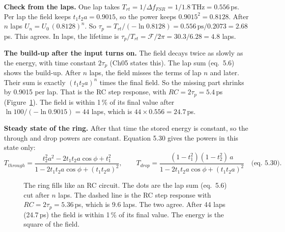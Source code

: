 \documentclass[11pt,letterpaper]{article}
\newcommand{\eq}[1]{(eq.~#1)}
\begin{document}
\textbf{Check from the laps.} One lap takes $T_{rt}=1/\Delta f_{FSR}=1/1.8\,\mathrm{THz}=0.556$\,ps. Per lap the
field keeps $t_1t_2a=0.9015$, so the power keeps $0.9015^2=0.8128$. After $n$ laps $U_n=U_0\,(0.8128)^n$. So
$\tau_p=T_{rt}/(-\ln0.8128)=0.556\,\mathrm{ps}/0.2073=2.68$\,ps. This agrees. In laps, the lifetime is
$\tau_p/T_{rt}=\mathcal{F}/2\pi=30.3/6.28=4.8$ laps.

\textbf{The build-up after the input turns on.} The field decays twice as slowly as the energy, with time constant
$2\tau_p$ (Ch05 states this). The lap sum \eq{5.6} shows the build-up. After $n$ laps, the field misses the terms of
lap $n$ and later. Their sum is exactly $(t_1t_2a)^n$ times the final field. So the missing part shrinks by 0.9015
per lap. That is the RC step response, with $RC=2\tau_p=5.4$\,ps (Figure~\ref{fig:build}). The field is within 1\,\%
of its final value after $\ln100/(-\ln0.9015)=44$ laps, which is $44\times0.556=24.7$\,ps.

\textbf{Steady state of the ring.} After that time the stored energy is constant, so the through and drop powers are
constant. Equation 5.30 gives the powers in this state only:
\[
T_{through}=\frac{t_2^2a^2-2t_1t_2a\cos\phi+t_1^2}{1-2t_1t_2a\cos\phi+(t_1t_2a)^2},\qquad
T_{drop}=\frac{(1-t_1^2)(1-t_2^2)\,a}{1-2t_1t_2a\cos\phi+(t_1t_2a)^2}\quad\text{\eq{5.30}}.
\]

\begin{figure}[H]
\centering
\begin{minipage}{0.5\linewidth}
\end{minipage}\hfill
\begin{minipage}{0.47\linewidth}
\caption{The ring fills like an RC circuit. The dots are the lap sum \eq{5.6} cut after $n$ laps. The dashed line
is the RC step response with $RC=2\tau_p=5.36$\,ps, which is 9.6 laps. The two agree. After 44 laps (24.7\,ps) the
field is within 1\,\% of its final value. The energy is the square of the field.}
\label{fig:build}
\end{minipage}
\end{figure}
\end{document}
